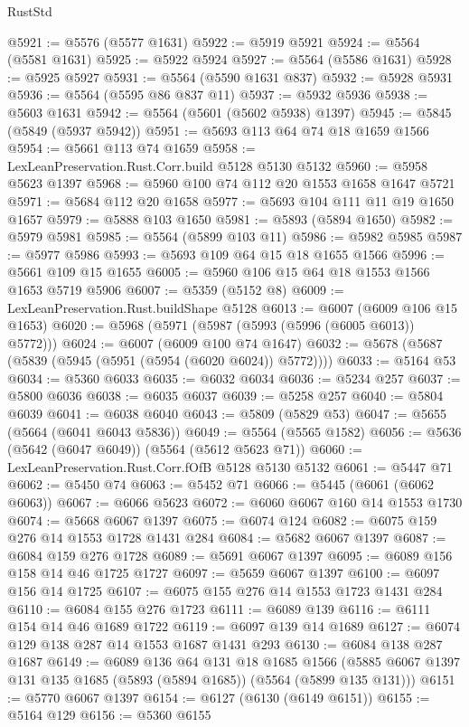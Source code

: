 \begin{lexlean}{RustStd}
\begin{coremodule}
{\begin{coremodule}
{{{{{{{{{{{{{{{{{{{{{{{{{{{{{{{{@5921 := @5576 (@5577 @1631)
@5922 := @5919 @5921
@5924 := @5564 (@5581 @1631)
@5925 := @5922 @5924
@5927 := @5564 (@5586 @1631)
@5928 := @5925 @5927
@5931 := @5564 (@5590 @1631 @837)
@5932 := @5928 @5931
@5936 := @5564 (@5595 @86 @837 @11)
@5937 := @5932 @5936
@5938 := @5603 @1631
@5942 := @5564 (@5601 (@5602 @5938) @1397)
@5945 := @5845 (@5849 (@5937 @5942))
@5951 := @5693 @113 @64 @74 @18 @1659 @1566
@5954 := @5661 @113 @74 @1659
@5958 := LexLeanPreservation.Rust.Corr.build @5128 @5130 @5132
@5960 := @5958 @5623 @1397
@5968 := @5960 @100 @74 @112 @20 @1553 @1658 @1647 @5721
@5971 := @5684 @112 @20 @1658
@5977 := @5693 @104 @111 @11 @19 @1650 @1657
@5979 := @5888 @103 @1650
@5981 := @5893 (@5894 @1650)
@5982 := @5979 @5981
@5985 := @5564 (@5899 @103 @11)
@5986 := @5982 @5985
@5987 := @5977 @5986
@5993 := @5693 @109 @64 @15 @18 @1655 @1566
@5996 := @5661 @109 @15 @1655
@6005 := @5960 @106 @15 @64 @18 @1553 @1566 @1653 @5719 @5906
@6007 := @5359 (@5152 @8)
@6009 := LexLeanPreservation.Rust.buildShape @5128
@6013 := @6007 (@6009 @106 @15 @1653)
@6020 := @5968 (@5971 (@5987 (@5993 (@5996 (@6005 @6013)) @5772)))
@6024 := @6007 (@6009 @100 @74 @1647)
@6032 := @5678 (@5687 (@5839 (@5945 (@5951 (@5954 (@6020 @6024)) @5772))))
@6033 := @5164 @53
@6034 := @5360 @6033
@6035 := @6032 @6034
@6036 := @5234 @257
@6037 := @5800 @6036
@6038 := @6035 @6037
@6039 := @5258 @257
@6040 := @5804 @6039
@6041 := @6038 @6040
@6043 := @5809 (@5829 @53)
@6047 := @5655 (@5664 (@6041 @6043 @5836))
@6049 := @5564 (@5565 @1582)
@6056 := @5636 (@5642 (@6047 @6049)) (@5564 (@5612 @5623 @71))
@6060 := LexLeanPreservation.Rust.Corr.fOfB @5128 @5130 @5132
@6061 := @5447 @71
@6062 := @5450 @74
@6063 := @5452 @71
@6066 := @5445 (@6061 (@6062 @6063))
@6067 := @6066 @5623
@6072 := @6060 @6067 @160 @14 @1553 @1730
@6074 := @5668 @6067 @1397
@6075 := @6074 @124
@6082 := @6075 @159 @276 @14 @1553 @1728 @1431 @284
@6084 := @5682 @6067 @1397
@6087 := @6084 @159 @276 @1728
@6089 := @5691 @6067 @1397
@6095 := @6089 @156 @158 @14 @46 @1725 @1727
@6097 := @5659 @6067 @1397
@6100 := @6097 @156 @14 @1725
@6107 := @6075 @155 @276 @14 @1553 @1723 @1431 @284
@6110 := @6084 @155 @276 @1723
@6111 := @6089 @139
@6116 := @6111 @154 @14 @46 @1689 @1722
@6119 := @6097 @139 @14 @1689
@6127 := @6074 @129 @138 @287 @14 @1553 @1687 @1431 @293
@6130 := @6084 @138 @287 @1687
@6149 := @6089
    @136
    @64
    @131
    @18
    @1685
    @1566
    (@5885 @6067 @1397 @131 @135 @1685 (@5893 (@5894 @1685)) (@5564 (@5899 @135 @131)))
@6151 := @5770 @6067 @1397
@6154 := @6127 (@6130 (@6149 @6151))
@6155 := @5164 @129
@6156 := @5360 @6155
}}}}}}}}}}}}}}}}}}}}}}}}}}}}}}}}
\end{coremodule}}
\end{coremodule}
\end{lexlean}
